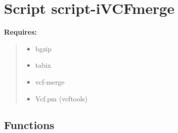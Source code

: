 %
%
%


\section{Script script-iVCFmerge}

    \label{script-iVCFmerge}
\textbf{Requires:}
\begin{quote}
  \begin{itemize}

  \item
    \setlength{\parskip}{0.6ex}
bgzip



  \item tabix



  \item vcf-merge



  \item Vcf.pm (vcftools)



\end{itemize}

\end{quote}



  \subsection{Functions}

    \label{script-iVCFmerge:get_parser}

    \vspace{0.5ex}

